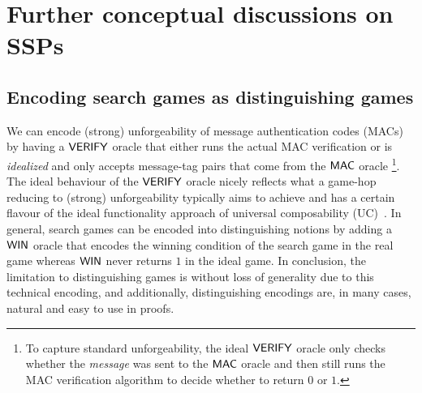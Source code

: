 \section{Further conceptual discussions on SSPs}

\subsection{Encoding search games as distinguishing games}\label{app:dist}
We can encode (strong) unforgeability of message authentication
codes (MACs) by having a $\mathsf{VERIFY}$ oracle that either
runs the actual MAC verification or is \emph{idealized} and only accepts
message-tag pairs that come from the $\mathsf{MAC}$ oracle
\footnote{To capture standard unforgeability, the ideal $\mathsf{VERIFY}$ oracle 
only checks whether the \emph{message} was sent to the $\mathsf{MAC}$ oracle
and then still runs the MAC verification algorithm to decide whether to
return $0$ or $1$.}. The ideal behaviour of the $\mathsf{VERIFY}$ oracle nicely 
reflects what a game-hop reducing to (strong) unforgeability typically
aims to achieve and has a certain flavour of the ideal functionality approach
of universal composability (UC)~\cite{X}. In general, search games can be
encoded into distinguishing notions by adding a $\mathsf{WIN}$ oracle that encodes the winning condition of the search game in the real game whereas $\mathsf{WIN}$ never
returns $1$ in the ideal game. In conclusion, the limitation to
distinguishing games is without loss of generality due to this technical
encoding, and additionally, distinguishing encodings are, in many cases,
natural and easy to use in proofs.

